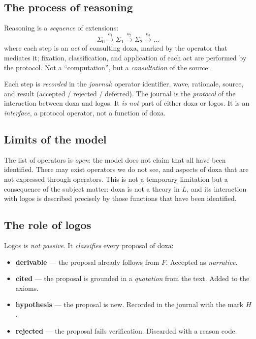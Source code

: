 \documentclass[12pt,a4paper]{article}
\begin{document}
\subsection{The process of reasoning}
\label{sec:process}

Reasoning is a \emph{sequence} of extensions:
\[
	\Sigma_0 \xrightarrow{o_1} \Sigma_1 \xrightarrow{o_2} \Sigma_2 \xrightarrow{o_3} \dots
\]
where each step is an \emph{act} of consulting doxa, marked by the operator
that mediates it; fixation, classification, and application of each act are
performed by the protocol. Not a ``computation'', but a \emph{consultation} of
the source.

Each step is \emph{recorded} in the \emph{journal}: operator identifier, wave,
rationale, source, and result (accepted / rejected / deferred). The journal is
the \emph{protocol} of the interaction between doxa and logos. It \emph{is not}
part of either doxa or logos. It is an \emph{interface}, a protocol operator,
not a function of doxa.

\subsection{Limits of the model}
\label{sec:model_limits}

The list of operators is \emph{open}: the model does not claim that all have
been identified. There may exist operators we do not see, and aspects of doxa
that are not expressed through operators. This is not a temporary limitation
but a consequence of the subject matter: doxa is not a theory in $L$, and its
interaction with logos is described precisely by those functions that have
been identified.

\subsection{The role of logos}
\label{sec:logos_role}

Logos is \emph{not passive}. It \emph{classifies} every proposal of doxa:

\begin{itemize}
	\item \textbf{derivable} --- the proposal already follows from $F$.
	      Accepted as \emph{narrative}.
	\item \textbf{cited} --- the proposal is grounded in a \emph{quotation}
	      from the text. Added to the axioms.
	\item \textbf{hypothesis} --- the proposal is new. Recorded in the
	      journal with the mark $H$.
	\item \textbf{rejected} --- the proposal fails verification. Discarded
	      with a reason code.
\end{itemize}
\end{document}

